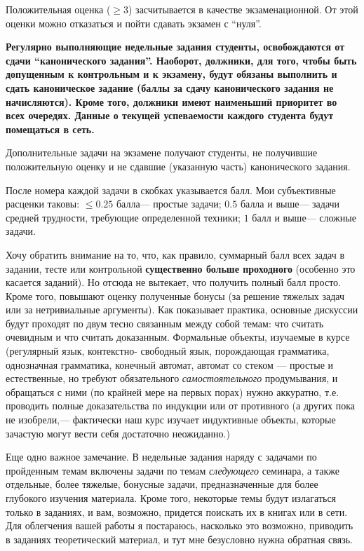 \documentclass[10pt,twocolumn]{article}
\begin{document}
{Положительная оценка ($\geq 3$) засчитывается в качестве экзаменационной. От этой оценки можно отказаться и
пойти сдавать экзамен с ``нуля''.

{\bf Регулярно выполняющие недельные задания студенты, освобождаются
от сдачи ``канонического задания''. Наоборот, должники, для того,
чтобы быть допущенным к контрольным и к экзамену, будут обязаны выполнить и сдать
каноническое задание (баллы за сдачу канонического задания не
начисляются). Кроме того, должники имеют наименьший приоритет во всех
очередях. Данные о текущей успеваемости каждого студента будут
помещаться в сеть.

Дополнительные задачи на экзамене получают студенты, не получившие положительную оценку и не сдавшие (указанную часть) канонического задания.
}

После номера каждой задачи в скобках указывается балл. Мои субъективные
расценки таковы: $\leq 0.25$ балла--- простые задачи; $0.5$ балла и выше---
задачи средней трудности, требующие определенной техники; $1$ балл и выше--- сложные задачи.

Хочу обратить внимание на то, что, как правило, суммарный балл всех
задач в задании, тесте или контрольной {\bf существенно больше
проходного} (особенно это касается заданий). Но отсюда не вытекает, что получить полный балл просто.
Кроме того, повышают оценку полученные бонусы (за
решение тяжелых задач или за нетривиальные аргументы).
Как показывает практика, основные дискуссии будут проходят по двум
тесно связанным между собой темам:  что считать очевидным и что считать
доказанным. Формальные объекты, изучаемые в курсе (регулярный язык,
контекстно- свободный язык, порождающая грамматика, однозначная
грамматика, конечный автомат, автомат со стеком --- простые и естественные, но требуют
обязательного {\em самостоятельного} продумывания, и обращаться с ними
(по крайней мере на первых порах) нужно аккуратно, т.е.
проводить полные доказательства по индукции или от противного (а других
пока не изобрели,--- фактически наш курс изучает индуктивные объекты,
которые зачастую могут вести себя достаточно неожиданно.)

Еще одно важное замечание. В недельные задания наряду с задачами по
пройденным темам включены задачи по темам {\em следующего} семинара,
а также отдельные, более тяжелые, бонусные задачи, предназначенные для
более глубокого изучения материала.
Кроме того, некоторые темы будут излагаться только в заданиях, и вам,
возможно, придется поискать их в книгах или в сети. Для облегчения
вашей работы я постараюсь, насколько это возможно, приводить в
заданиях теоретический материал, и тут мне безусловно нужна обратная
связь.


}
\end{document}
